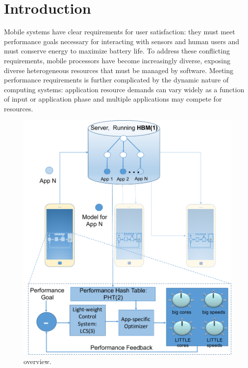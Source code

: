 \section{Introduction}
Mobile systems have clear requirements for user satisfaction: they
must meet performance goals necessary for interacting with sensors and
human users and must conserve energy to maximize battery life.  To
address these conflicting requirements, mobile processors have become
increasingly diverse, exposing diverse heterogeneous resources that
must be managed by software. Meeting performance requirements is
further complicated by the dynamic nature of computing systems:
application resource demands can vary widely as a function of input or
application phase and multiple applications may compete for resources.

\begin{figure}
\includegraphics[width=\columnwidth]{figures/mobile-leo-poet.pdf}
\caption{\SYSTEM{} overview.}
  \label{fig:overview}
\end{figure}

